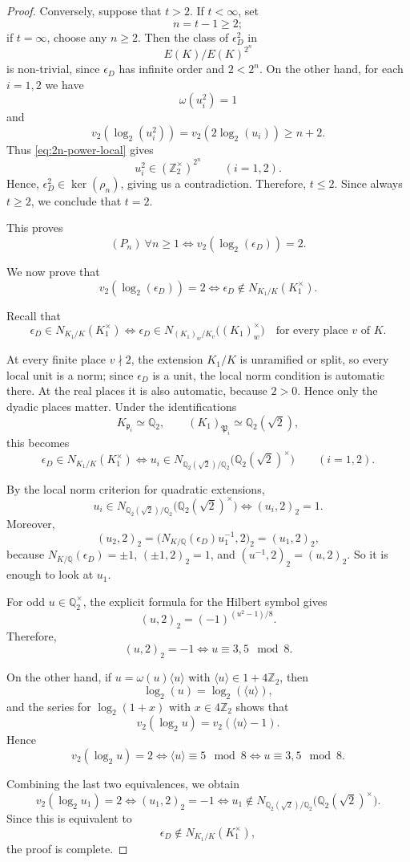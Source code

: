 \documentclass{article}
\numberwithin{equation}{section}
\theoremstyle{plain}  %
\theoremstyle{definition}
\newcommand{\Z}{\mathbb{Z}}
\newcommand{\Q}{\mathbb{Q}}
\newcommand{\fk}{\mathfrak }
\begin{document}
\begin{proof}
Conversely, suppose that $t>2$. If $t<\infty$, set
$$
n=t-1\ge 2;
$$
if $t=\infty$, choose any $n\ge 2$. Then the class of $\epsilon_D^2$ in
$$
E(K)/E(K)^{2^n}
$$
is non-trivial, since $\epsilon_D$ has infinite order and $2<2^n$. On the other hand, for each $i=1,2$ we have
$$
\omega(u_i^2)=1
$$
and
$$
v_2(\log_2(u_i^2))
=
v_2(2\log_2(u_i))
\ge n+2.
$$
Thus \eqref{eq:2n-power-local} gives
$$
u_i^2\in (\Z_2^\times)^{2^n}
\qquad (i=1,2).
$$
Hence, $\epsilon_D^2\in \ker(\rho_n)$, giving us a contradiction. Therefore, $t\le 2$.
Since always $t\ge 2$, we conclude that $t=2$.

This proves
$$
(P_n)\ \forall n\ge 1
\iff
v_2(\log_2(\epsilon_D))=2.
$$

We now prove that
$$
v_2(\log_2(\epsilon_D))=2
\iff
\epsilon_D\notin N_{K_1/K}(K_1^\times).
$$

Recall that
$$
\epsilon_D\in N_{K_1/K}(K_1^\times)
\iff
\epsilon_D\in N_{(K_1)_w/K_v}\bigl((K_1)_w^\times\bigr)
\quad\text{for every place }v\text{ of }K.
$$

At every finite place $v\nmid 2$, the extension $K_1/K$ is unramified or split, so every local unit is a norm; since $\epsilon_D$ is a unit, the local norm condition is automatic there. At the real places it is also automatic, because $2>0$. Hence only the dyadic places matter. Under the identifications
$$
K_{\fk p_i}\simeq \Q_2,
\qquad
(K_1)_{\fk P_i}\simeq \Q_2(\sqrt2),
$$
this becomes
$$
\epsilon_D\in N_{K_1/K}(K_1^\times)
\iff
u_i\in N_{\Q_2(\sqrt2)/\Q_2}\bigl(\Q_2(\sqrt2)^\times\bigr)
\qquad (i=1,2).
$$

By the local norm criterion for quadratic extensions,
$$
u_i\in N_{\Q_2(\sqrt2)/\Q_2}\bigl(\Q_2(\sqrt2)^\times\bigr)
\iff
(u_i,2)_2=1.
$$
Moreover,
$$
(u_2,2)_2
=
\bigl(N_{K/\Q}(\epsilon_D)u_1^{-1},2\bigr)_2
=
(u_1,2)_2,
$$
because $N_{K/\Q}(\epsilon_D)=\pm1$, $(\pm1,2)_2=1$, and $(u^{-1},2)_2=(u,2)_2$.
So it is enough to look at $u_1$.

For odd $u\in \Q_2^\times$, the explicit formula for the Hilbert symbol gives
$$
(u,2)_2=(-1)^{(u^2-1)/8}.
$$
Therefore,
$$
(u,2)_2=-1
\iff
u\equiv 3,5 \mod 8.
$$

On the other hand, if $u=\omega(u)\langle u\rangle$ with $\langle u\rangle\in 1+4\Z_2$, then
$$
\log_2(u)=\log_2(\langle u\rangle),
$$
and the series for $\log_2(1+x)$ with $x\in 4\Z_2$ shows that
$$
v_2(\log_2 u)=v_2(\langle u\rangle-1).
$$
Hence
$$
v_2(\log_2 u)=2
\iff
\langle u\rangle\equiv 5 \mod 8
\iff
u\equiv 3,5 \mod 8.
$$

Combining the last two equivalences, we obtain
$$
v_2(\log_2 u_1)=2
\iff
(u_1,2)_2=-1
\iff
u_1\notin N_{\Q_2(\sqrt2)/\Q_2}\bigl(\Q_2(\sqrt2)^\times\bigr).
$$
Since this is equivalent to
$$
\epsilon_D\notin N_{K_1/K}(K_1^\times),
$$
the proof is complete.
\end{proof}
\end{document}
